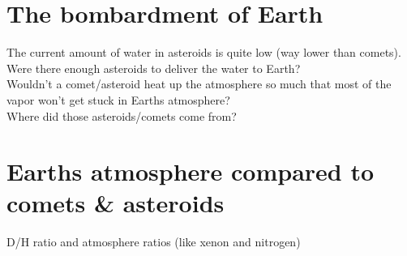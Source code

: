 \documentclass[11pt]{article}
\begin{document}
\section{The bombardment of Earth}
The current amount of water in asteroids is quite low (way lower than comets). Were there enough asteroids to deliver the water to Earth?\\
Wouldn't a comet/asteroid heat up the atmosphere so much that most of the vapor won't get stuck in Earths atmosphere?\\
Where did those asteroids/comets come from?\\


\section{Earths atmosphere compared to comets \& asteroids}
D/H ratio and atmosphere ratios (like xenon and nitrogen)\\


\newpage				%



\newpage				%



\newpage				%


\end{document}
